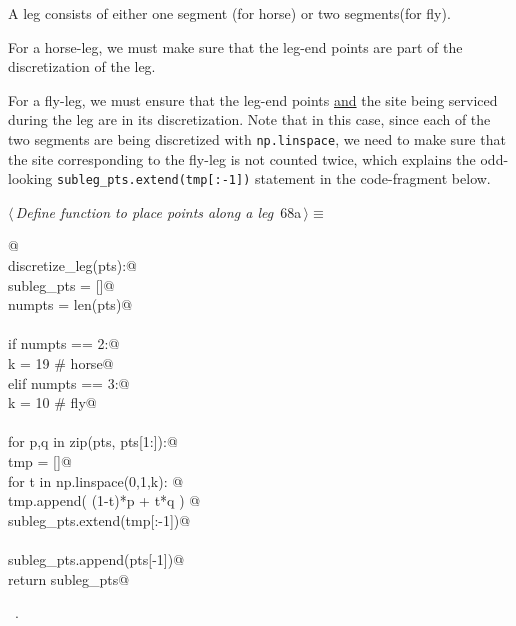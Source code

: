 \documentclass[11.5pt]{report}
\begin{document}
A leg consists of either one segment (for horse) or two segments(for fly). 

For a horse-leg, we must make sure that the leg-end points are part of the discretization of the leg. 

For a fly-leg, we must ensure that the leg-end points \underline{and} the site being 
serviced during the leg are in its discretization. Note that in this case, 
since each of the two segments are being discretized with \verb|np.linspace|, we need
to make sure that the site corresponding to the fly-leg is not counted twice, which
explains the odd-looking \verb|subleg_pts.extend(tmp[:-1])| statement in the code-fragment below. 

\begin{flushleft} \small
\begin{minipage}{\linewidth}\label{scrap97}\raggedright\small
{} $\langle\,${\itshape Define function to place points along a leg}\nobreak\ {\footnotesize {68a}}$\,\rangle\equiv$
\vspace{-1ex}
\begin{list}{}{} \item
\mbox{}\verb@   @\\
\mbox{}\verb@def discretize_leg(pts):@\\
\mbox{}\verb@   subleg_pts = []@\\
\mbox{}\verb@   numpts     = len(pts)@\\
\mbox{}\verb@@\\
\mbox{}\verb@   if numpts == 2:@\\
\mbox{}\verb@       k  = 19 # horse@\\
\mbox{}\verb@   elif numpts == 3:@\\
\mbox{}\verb@       k  = 10 # fly@\\
\mbox{}\verb@@\\
\mbox{}\verb@   for p,q in zip(pts, pts[1:]):@\\
\mbox{}\verb@       tmp = []@\\
\mbox{}\verb@       for t in np.linspace(0,1,k): @\\
\mbox{}\verb@           tmp.append( (1-t)*p + t*q ) @\\
\mbox{}\verb@       subleg_pts.extend(tmp[:-1])@\\
\mbox{}\verb@@\\
\mbox{}\verb@   subleg_pts.append(pts[-1])@\\
\mbox{}\verb@   return subleg_pts@\\
\mbox{}\verb@@{\NWsep}
\end{list}
\vspace{-1.5ex}
\footnotesize
\begin{list}{}{\setlength{\itemsep}{-\parsep}\setlength{\itemindent}{-\leftmargin}}
\item \NWtxtMacroRefIn\ .

\item{}
\end{list}
\end{minipage}\vspace{4ex}
\end{flushleft}
\end{document}
